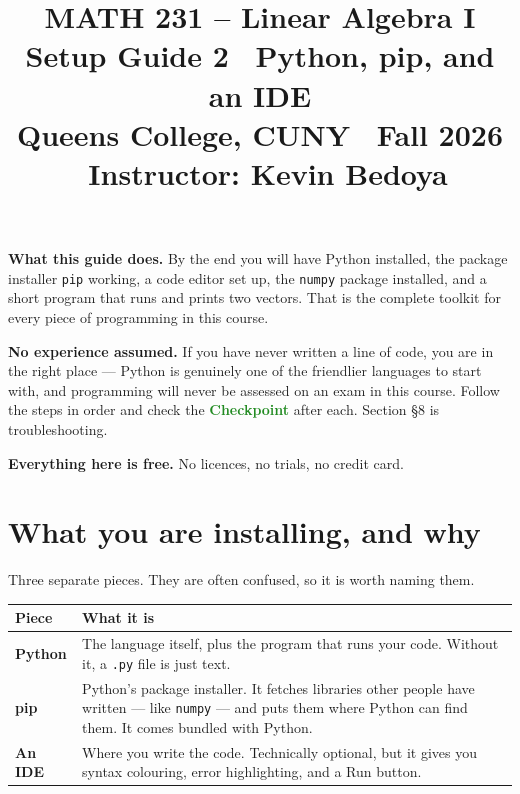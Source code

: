 \documentclass[11pt]{article}
\title{\vspace{-1.2cm}\textbf{\sffamily MATH 231 -- Linear Algebra I}\\[4pt]
       {\large\sffamily Setup Guide 2 \textbullet\ Python, pip, and an IDE}\\[2pt]
       {\normalsize\sffamily Queens College, CUNY \textbullet\ Fall 2026
        \textbullet\ Instructor: Kevin Bedoya}}
\author{}
\date{}
\begin{document}
\maketitle
\vspace{-1.4cm}

\noindent\textbf{What this guide does.} By the end you will have Python
installed, the package installer \texttt{pip} working, a code editor set up, the
\texttt{numpy} package installed, and a short program that runs and prints two
vectors. That is the complete toolkit for every piece of programming in this
course.

\medskip
\noindent\textbf{No experience assumed.} If you have never written a line of
code, you are in the right place --- Python is genuinely one of the friendlier
languages to start with, and programming will never be assessed on an exam in
this course. Follow the steps in order and check the
\textcolor{ForestGreen}{\sffamily\bfseries Checkpoint} after each. Section \S8
is troubleshooting.

\medskip
\noindent\textbf{Everything here is free.} No licences, no trials, no credit
card.

\section{What you are installing, and why}
Three separate pieces. They are often confused, so it is worth naming them.

\begin{center}
\renewcommand{\arraystretch}{1.5}
\begin{tabular}{@{}l p{10.2cm}@{}}
\toprule
\textbf{Piece} & \textbf{What it is} \\
\midrule
\textbf{Python} & The language itself, plus the program that runs your code.
                  Without it, a \texttt{.py} file is just text. \\
\textbf{pip}    & Python's package installer. It fetches libraries other people
                  have written --- like \texttt{numpy} --- and puts them where
                  Python can find them. It comes bundled with Python. \\
\textbf{An IDE} & Where you write the code. Technically optional, but it gives
                  you syntax colouring, error highlighting, and a Run button. \\
\bottomrule
\end{tabular}
\end{center}
\end{document}

